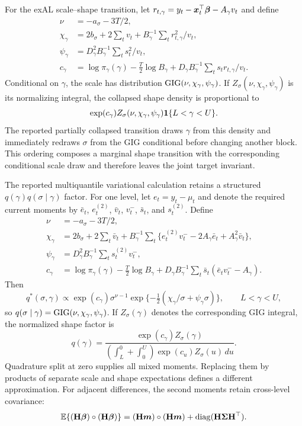 For the exAL scale--shape transition, let
\(r_{t,\gamma}=y_t-\boldsymbol{x}_t^\top\boldsymbol{\beta}-A_\gamma v_t\) and define
\begin{align}
\nu&=-a_\sigma-3T/2,\nonumber\\
\chi_\gamma&=2b_\sigma+2\sum_t v_t+
B_\gamma^{-1}\sum_t r_{t,\gamma}^2/v_t,\nonumber\\
\psi_\gamma&=D_\gamma^2B_\gamma^{-1}\sum_t s_t^2/v_t,\nonumber\\
c_\gamma&=\log\pi_\gamma(\gamma)-\tfrac T2\log B_\gamma+
D_\gamma B_\gamma^{-1}\sum_t s_t r_{t,\gamma}/v_t.
\label{qdesn2026:eq:supp_mcmc_scale_shape_terms}
\end{align}
Conditional on \(\gamma\), the scale has distribution
\(\operatorname{GIG}(\nu,\chi_\gamma,\psi_\gamma)\). If
\(Z_\sigma(\nu,\chi_\gamma,\psi_\gamma)\) is its normalizing integral, the
collapsed shape density is proportional to
\[
\exp(c_\gamma)Z_\sigma(\nu,\chi_\gamma,\psi_\gamma)
\mathbf{1}\{L<\gamma<U\}.
\]
The reported partially collapsed transition draws \(\gamma\) from this density
and immediately redraws \(\sigma\) from the GIG conditional before changing
another block. This ordering composes a marginal shape transition with the
corresponding conditional scale draw and therefore leaves the joint target
invariant.

The reported multiquantile variational calculation retains a structured
\(q(\gamma)q(\sigma\mid\gamma)\) factor. For one level, let
\(e_t=y_t-\mu_t\) and denote the required current moments by
\(\bar e_t\), \(e_t^{(2)}\), \(\bar v_t\), \(v_t^-\),
\(\bar s_t\), and \(s_t^{(2)}\). Define
\begin{align}
\nu&=-a_\sigma-3T/2,\nonumber\\
\chi_\gamma&=2b_\sigma+2\sum_t\bar v_t+
B_\gamma^{-1}\sum_t
\{e_t^{(2)}v_t^- -2A_\gamma\bar e_t+A_\gamma^2\bar v_t\},\nonumber\\
\psi_\gamma&=D_\gamma^2B_\gamma^{-1}
\sum_t s_t^{(2)}v_t^-,\nonumber\\
c_\gamma&=\log\pi_\gamma(\gamma)-\tfrac T2\log B_\gamma+
D_\gamma B_\gamma^{-1}
\sum_t\bar s_t(\bar e_tv_t^- -A_\gamma).
\label{qdesn2026:eq:supp_structured_scale_shape_terms}
\end{align}
Then
\begin{equation}
q^*(\sigma,\gamma)\propto
\exp(c_\gamma)\sigma^{\nu-1}
\exp\{-\tfrac12(\chi_\gamma/\sigma+\psi_\gamma\sigma)\},
\qquad L<\gamma<U,
\label{qdesn2026:eq:supp_structured_scale_shape_kernel}
\end{equation}
so \(q(\sigma\mid\gamma)=\operatorname{GIG}(\nu,\chi_\gamma,\psi_\gamma)\). If
\(Z_\sigma(\gamma)\) denotes the corresponding GIG integral, the normalized
shape factor is
\begin{equation}
q(\gamma)=
\frac{\exp(c_\gamma)Z_\sigma(\gamma)}
{(\int_L^0+\int_0^U)\exp(c_u)Z_\sigma(u)\,du}.
\label{qdesn2026:eq:supp_structured_shape_factor}
\end{equation}
Quadrature split at zero supplies all mixed moments. Replacing them by products
of separate scale and shape expectations defines a different approximation.
For adjacent differences, the second moments retain cross-level covariance:
\[
\mathbb{E}\{(\mathbf{H}\boldsymbol{\beta})\circ(\mathbf{H}\boldsymbol{\beta})\}
=(\mathbf{H}\boldsymbol{m})\circ(\mathbf{H}\boldsymbol{m})
+\operatorname{diag}(\mathbf{H}\mathbf{\Sigma}\mathbf{H}^\top).
\]

